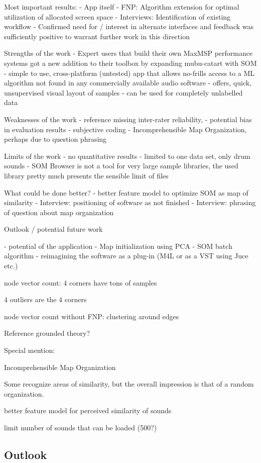 Most important results:
- App itself
- FNP: Algorithm extension for optimal utilization of allocated screen space
- Interviews: Identification of existing workflow
- Confirmed need for / interest in alternate interfaces and feedback was
sufficiently positive to warrant further work in this direction



Strengths of the work
- Expert users that build their own MaxMSP performance systems got a new
  addition to their toolbox by expanding mubu-catart with SOM
- simple to use, cross-platform (untested) app that allows no-frills access to
  a ML algorithm not found in any commercially available audio software
- offers, quick, unsupervised visual layout of samples
- can be used for completely unlabelled data



Weaknesses of the work
- reference missing inter-rater reliability,
- potential bias in evaluation results
- subjective coding
- Incomprehensible Map Organization, perhaps due to question phrasing


Limits of the work
- no quantitative results
- limited to one data set, only drum sounds
- SOM Browser is not a tool for very large sample libraries, the used library
pretty much presents the sensible limit of files



What could be done better?
- better feature model to optimize SOM as map of similarity
- Interview: positioning of software as not finished
- Interview: phrasing of question about map organization



Outlook / potential future work

- potential of the application
- Map initialization using PCA
- SOM batch algorithm
- reimagining the software as a plug-in (M4L or as a VST using Juce etc.)






node vector count: 4 corners have tons of samples

4 outliers are the 4 corners

node vector count without FNP: clustering around edges

Reference grounded theory?

Special mention:

Incomprehensible Map Organization

Some recognize areas of similarity, but the overall impression is that of a
random organization.






better feature model for perceived similarity of sounds

limit number of sounds that can be loaded (500?)



\subsection{Outlook}
\label{subsec:outlook}

